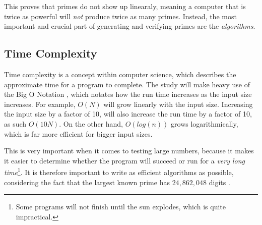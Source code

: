 \documentclass[main.tex]{subfiles}
\begin{document}
\begin{center}
\end{center}

This proves that primes do not show up linearaly, meaning a computer that is twice as powerful will \textit{not} produce twice as many primes. Instead, the most important and crucial part of generating and verifying primes are the \textit{algorithms}.

\subsection{Time Complexity}

Time complexity \cite{theorem:time_comp} is a concept within computer science, which describes the approximate time for a program to complete. The study will make heavy use of the Big O Notation \cite{theorem:big_O}, which notates how the run time increases as the input size increases. For example, $O(N)$ will grow linearly with the input size. Increasing the input size by a factor of 10, will also increase the run time by a factor of 10, as such $O(10N)$. On the other hand, $O(log(n))$ grows logarithmically, which is far more efficient for bigger input sizes. 

This is very important when it comes to testing large numbers, because it makes it easier to determine whether the program will succeed or run for a \textit{very long time}\footnote{Some programs will not finish until the sun explodes, which is quite impractical.}. It is therefore important to write as efficient algorithms as possible, considering the fact that the largest known prime has $24,862,048$ digits \cite{prime:largest_digits}. 

\end{document}
